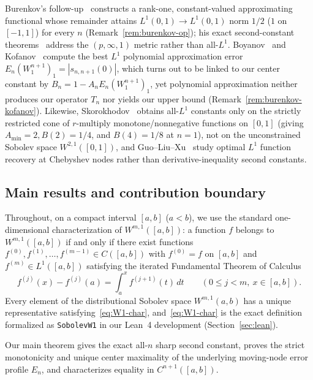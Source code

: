 \documentclass[11pt,a4paper]{article}
\newcommand{\code}[1]{\nolinkurl{#1}}
\theoremstyle{remark}
\numberwithin{equation}{section}
\begin{document}
\begin{itemize}[leftmargin=1.8em]
    Burenkov's follow-up~\cite[Theorem~2(1), p.~41]{Burenkov1986} constructs a rank-one, constant-valued approximating functional whose remainder attains $L^1(0,1) \to L^1(0,1)$ norm $1/2$ ($1$ on $[-1,1]$) for every $n$ (Remark~\ref{rem:burenkov-op}); his exact second-constant theorems~\cite[Theorem~2(7), Theorem~4]{Burenkov1986} address the $(p, \infty, 1)$ metric rather than all-$L^1$. Boyanov~\cite[\S3]{Boyanov1975} and Kofanov~\cite[Theorems~3 and~5]{Kofanov1984} compute the best $L^1$ polynomial approximation error $E_n(W_1^{n+1})_1 = |s_{n,n+1}(0)|$, which turns out to be linked to our center constant by $B_n = 1 - A_n E_n(W_1^{n+1})_1$, yet polynomial approximation neither produces our operator $T_n$ nor yields our upper bound (Remark~\ref{rem:burenkov-kofanov}). Likewise, Skorokhodov~\cite[Theorem~5.6.6, p.~293]{Skorokhodov2018} obtains all-$L^1$ constants only on the strictly restricted cone of $r$-multiply monotone/nonnegative functions on $[0,1]$ (giving $A_{\min} = 2, B(2) = 1/4$, and $B(4) = 1/8$ at $n = 1$), not on the unconstrained Sobolev space $W^{2,1}([0,1])$, and Guo--Liu--Xu~\cite{GuoLiuXu2024} study optimal $L^1$ function recovery at Chebyshev nodes rather than derivative-inequality second constants.
\end{itemize}

\subsection{Main results and contribution boundary}
\label{sec:results}

Throughout, on a compact interval $[a,b]$ ($a < b$), we use the standard one-dimensional characterization of $W^{m,1}([a,b])$: a function $f$ belongs to $W^{m,1}([a,b])$ if and only if there exist functions $f^{(0)}, f^{(1)}, \dots, f^{(m-1)} \in C([a,b])$ with $f^{(0)} = f$ on $[a,b]$ and $f^{(m)} \in L^1([a,b])$ satisfying the iterated Fundamental Theorem of Calculus
\begin{equation}
    f^{(j)}(x) - f^{(j)}(a) = \int_a^x f^{(j+1)}(t)\,dt
    \qquad (0 \le j < m,\ x \in [a,b]).
    \label{eq:W1-char}
\end{equation}
Every element of the distributional Sobolev space $W^{m,1}(a,b)$ has a unique representative satisfying~\eqref{eq:W1-char}, and~\eqref{eq:W1-char} is the exact definition formalized as \code{SobolevW1} in our Lean~4 development (Section~\ref{sec:lean}).

Our main theorem gives the exact all-$n$ sharp second constant, proves the strict monotonicity and unique center maximality of the underlying moving-node error profile $E_n$, and characterizes equality in $C^{n+1}([a,b])$.
\end{document}
